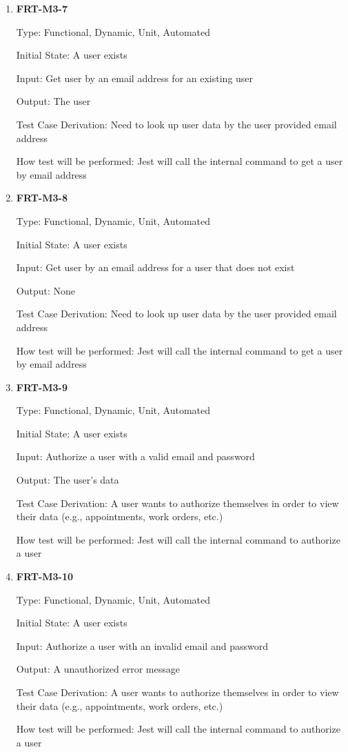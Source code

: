 \documentclass[12pt, titlepage]{article}
\begin{document}
\begin{enumerate}
	\item \textbf{FRT-M3-7}

	      Type: Functional, Dynamic, Unit, Automated

	      Initial State: A user exists

	      Input: Get user by an email address for an existing user

	      Output: The user

	      Test Case Derivation: Need to look up user data by the user provided email address

	      How test will be performed: Jest will call the internal command to get a user by email address

	\item \textbf{FRT-M3-8}

	      Type: Functional, Dynamic, Unit, Automated

	      Initial State: A user exists

	      Input: Get user by an email address for a user that does not exist

	      Output: None

	      Test Case Derivation: Need to look up user data by the user provided email address

	      How test will be performed: Jest will call the internal command to get a user by email address

	\item \textbf{FRT-M3-9}

	      Type: Functional, Dynamic, Unit, Automated

	      Initial State: A user exists

	      Input: Authorize a user with a valid email and password

	      Output: The user's data

	      Test Case Derivation: A user wants to authorize themselves in order to view their data (e.g.,
	      appointments, work orders, etc.)

	      How test will be performed: Jest will call the internal command to authorize a user

	\item \textbf{FRT-M3-10}

	      Type: Functional, Dynamic, Unit, Automated

	      Initial State: A user exists

	      Input: Authorize a user with an invalid email and password

	      Output: A unauthorized error message

	      Test Case Derivation: A user wants to authorize themselves in order to view their data (e.g.,
	      appointments, work orders, etc.)

	      How test will be performed: Jest will call the internal command to authorize a user

\end{enumerate}
\end{document}
